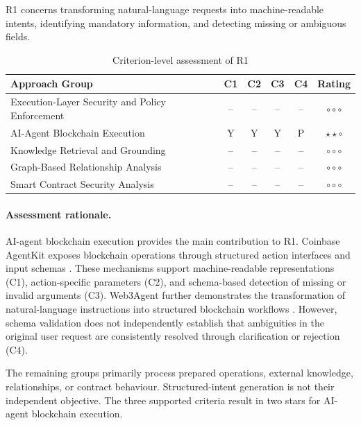 R1 concerns transforming natural-language requests
into machine-readable intents, identifying mandatory
information, and detecting missing or ambiguous fields.

\begin{table}[H]
\centering
\small
\renewcommand{\arraystretch}{1.25}
\begin{tabular}{p{5.0cm}ccccc}
\hline
\textbf{Approach Group}
& \textbf{C1}
& \textbf{C2}
& \textbf{C3}
& \textbf{C4}
& \textbf{Rating} \\
\hline

Execution-Layer Security and Policy Enforcement
& -- & -- & -- & --
& $\circ\circ\circ$ \\

AI-Agent Blockchain Execution
& Y & Y & Y & P
& $\star\star\circ$ \\

Knowledge Retrieval and Grounding
& -- & -- & -- & --
& $\circ\circ\circ$ \\

Graph-Based Relationship Analysis
& -- & -- & -- & --
& $\circ\circ\circ$ \\

Smart Contract Security Analysis
& -- & -- & -- & --
& $\circ\circ\circ$ \\

\hline
\end{tabular}
\caption{Criterion-level assessment of R1}
\label{tab:appendix_r1}
\end{table}

\paragraph{Assessment rationale.}

AI-agent blockchain execution provides the main
contribution to R1. Coinbase AgentKit exposes
blockchain operations through structured action
interfaces and input schemas
\cite{coinbaseAgentKit2026,
coinbaseAgentKitActionSchemas2026}.
These mechanisms support machine-readable
representations (C1), action-specific parameters
(C2), and schema-based detection of missing or
invalid arguments (C3). Web3Agent further demonstrates the transformation
of natural-language instructions into structured
blockchain workflows \cite{fanWeb3Agent2026}.
However, schema validation does not independently
establish that ambiguities in the original user
request are consistently resolved through
clarification or rejection (C4).

The remaining groups primarily process prepared
operations, external knowledge, relationships,
or contract behaviour. Structured-intent generation
is not their independent objective. The three
supported criteria result in two stars for
AI-agent blockchain execution.

